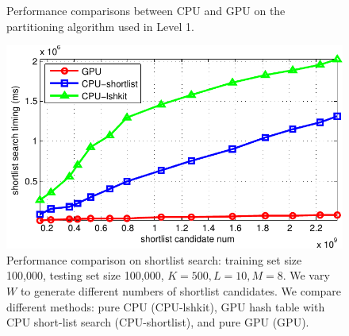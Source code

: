 \begin{figure}[!h]
  \caption[Performance comparisons between CPU-based and GPU-based partitioning components in Bi-level LSH]{\label{fig:6:res:level1} Performance comparisons between CPU and GPU on the partitioning algorithm used in Level 1.}
\end{figure}


\begin{figure}[!h]
  \centering
  \includegraphics[width=0.8\linewidth]{figs/6/res/shortlist.pdf}
  \caption[Performance comparison on shortlist search used in Bi-level LSH]{\label{fig:6:res:shortlist} Performance comparison on shortlist search: training set size 100,000, testing set size 100,000, $K=500, L=10, M=8$. We vary $W$ to generate different numbers of shortlist candidates. We compare different methods: pure CPU (CPU-lshkit), GPU hash table with CPU short-list search (CPU-shortlist), and pure GPU (GPU).}
\end{figure}


